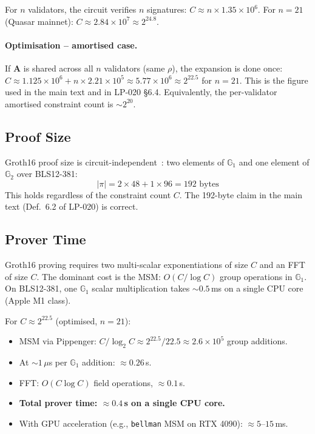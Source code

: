 \documentclass[11pt]{article}
\begin{document}
For $n$ validators, the circuit verifies $n$ signatures:
$C \approx n \times 1.35 \times 10^6$.  For $n = 21$ (Quasar mainnet):
$C \approx 2.84 \times 10^7 \approx 2^{24.8}$.

\paragraph{Optimisation -- amortised case.}
If $\mathbf{A}$ is shared across all $n$ validators (same $\rho$),
the expansion is done once: $C \approx 1.125 \times 10^6 + n \times
2.21 \times 10^5 \approx 5.77 \times 10^6 \approx 2^{22.5}$ for
$n = 21$.  This is the figure used in the main text and in LP-020
\S6.4.  Equivalently, the per-validator amortised constraint count is
$\sim 2^{20}$.

\subsection{Proof Size}

Groth16 proof size is circuit-independent~\cite{groth2016}: two
elements of $\mathbb{G}_1$ and one element of $\mathbb{G}_2$ over
BLS12-381:
\[
  |\pi| = 2 \times 48 + 1 \times 96 = 192 \text{ bytes}
\]
This holds regardless of the constraint count $C$.  The 192-byte claim
in the main text (Def.~6.2 of LP-020) is correct.

\subsection{Prover Time}

Groth16 proving requires two multi-scalar exponentiations of size $C$
and an FFT of size $C$.  The dominant cost is the MSM:
$O(C / \log C)$ group operations in $\mathbb{G}_1$.  On BLS12-381,
one $\mathbb{G}_1$ scalar multiplication takes $\sim 0.5$\,ms on a
single CPU core (Apple M1 class).

For $C \approx 2^{22.5}$ (optimised, $n = 21$):
\begin{itemize}[nosep]
  \item MSM via Pippenger: $C / \log_2 C \approx 2^{22.5} / 22.5
    \approx 2.6 \times 10^5$ group additions.
  \item At $\sim 1\,\mu$s per $\mathbb{G}_1$ addition: $\approx 0.26$\,s.
  \item FFT: $O(C \log C)$ field operations, $\approx 0.1$\,s.
  \item \textbf{Total prover time: $\approx 0.4$\,s on a single CPU core.}
  \item With GPU acceleration (e.g., \texttt{bellman} MSM on RTX 4090):
    $\approx 5\text{--}15$\,ms.
\end{itemize}
\end{document}
